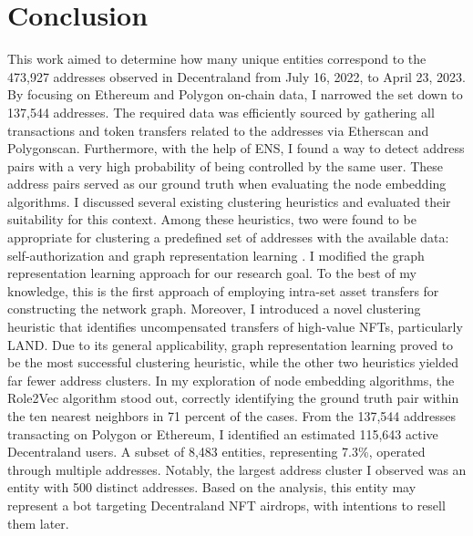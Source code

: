 \documentclass[12pt,a4paper,titlepage,oneside,english]{article}
\begin{document}
\section{Conclusion}
This work aimed to determine how many unique entities correspond to the 473,927 addresses observed in Decentraland from July 16, 2022, to April 23, 2023. \newline
By focusing on Ethereum and Polygon on-chain data, I narrowed the set down to 137,544 addresses. The required data was efficiently sourced by gathering all transactions and token transfers related to the addresses via Etherscan and Polygonscan. Furthermore, with the help of ENS, I found a way to detect address pairs with a very high probability of being controlled by the same user. These address pairs served as our ground truth when evaluating the node embedding algorithms. \newline
I discussed several existing clustering heuristics and evaluated their suitability for this context. Among these heuristics, two were found to be appropriate for clustering a predefined set of addresses with the available data: self-authorization \citep{FV:17} and graph representation learning \citep{Beres2020}. I modified the graph representation learning approach for our research goal. %
To the best of my knowledge, this is the first approach of employing intra-set asset transfers for constructing the network graph. Moreover, I introduced a novel clustering heuristic that identifies uncompensated transfers of high-value NFTs, particularly LAND. \newline
Due to its general applicability, graph representation learning proved to be the most successful clustering heuristic, while the other two heuristics yielded far fewer address clusters. In my exploration of node embedding algorithms, the Role2Vec algorithm stood out, correctly identifying the ground truth pair within the ten nearest neighbors in 71 percent of the cases. \newline
From the 137,544 addresses transacting on Polygon or Ethereum, I identified an estimated 115,643 active Decentraland users. A subset of 8,483 entities, representing 7.3\%, operated through multiple addresses. Notably, the largest address cluster I observed was an entity with 500 distinct addresses. Based on the analysis, this entity may represent a bot targeting Decentraland NFT airdrops, with intentions to resell them later. \newline
\end{document}
